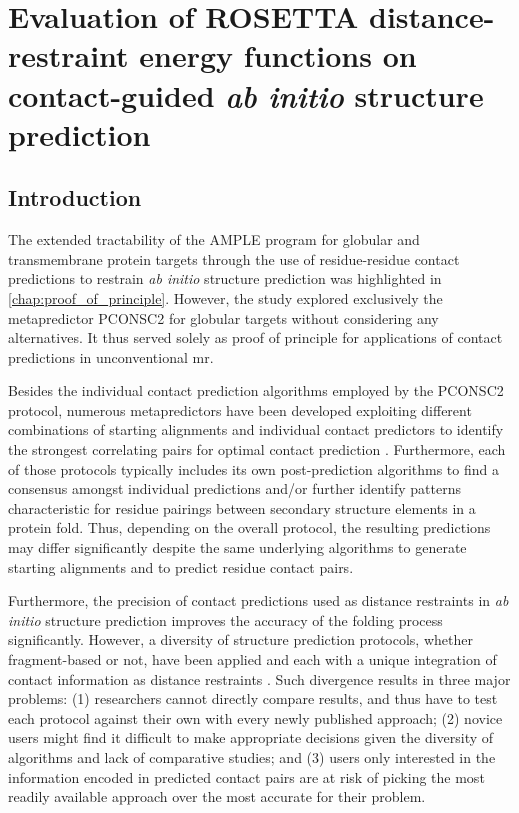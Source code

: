 \chapter{Evaluation of ROSETTA distance-restraint energy functions on contact-guided \textit{ab initio} structure prediction} \label{chap:rosetta_energy_functions}
\clearpage

\section{Introduction}
The extended tractability of the AMPLE program for globular and transmembrane protein targets through the use of residue-residue contact predictions to restrain \textit{ab initio} structure prediction was highlighted in \cref{chap:proof_of_principle}. However, the study explored exclusively the metapredictor PCONSC2 for globular targets without considering any alternatives. It thus served solely as proof of principle for applications of contact predictions in unconventional \gls{mr}.

Besides the individual contact prediction algorithms employed by the PCONSC2 protocol, numerous metapredictors have been developed exploiting different combinations of starting alignments and individual contact predictors to identify the strongest correlating pairs for optimal contact prediction \cite{Kamisetty2013-le,Skwark2014-qp,Jones2015-vq,Ma2015-vo,He2017-fn,Michel2017-pm,Wang2017-rx}. Furthermore, each of those protocols typically includes its own post-prediction algorithms to find a consensus amongst individual predictions and/or further identify patterns characteristic for residue pairings between secondary structure elements in a protein fold. Thus, depending on the overall protocol, the resulting predictions may differ significantly despite the same underlying algorithms to generate starting alignments and to predict residue contact pairs.

Furthermore, the precision of contact predictions used as distance restraints in \textit{ab initio} structure prediction improves the accuracy of the folding process significantly. However, a diversity of structure prediction protocols, whether fragment-based or not, have been applied and each with a unique integration of contact information as distance restraints \cite{Marks2011-os,Michel2014-eg,Adhikari2015-lb,Jones2015-vq,Ovchinnikov2015-tn,Adhikari2018-lj}. Such divergence results in three major problems: (1) researchers cannot directly compare results, and thus have to test each protocol against their own with every newly published approach; (2) novice users might find it difficult to make appropriate decisions given the diversity of algorithms and lack of comparative studies; and (3) users only interested in the information encoded in predicted contact pairs are at risk of picking the most readily available approach over the most accurate for their problem.


